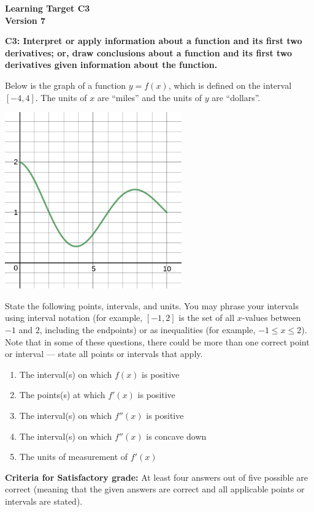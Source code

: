 \documentclass[10pt]{article}
\begin{document}
	\vspace*{0in}

		\begin{center}
			\textbf{Learning Target C3 \\
			Version 7} \\
		\end{center}


\begin{framed}
	\textbf{C3: Interpret or apply information about a function and its first two derivatives; or, draw conclusions about a function and its first two derivatives given information about the function. }
\end{framed}

Below is the graph of a function $y = f(x)$, which is defined on the interval $[-4,4]$. The units of $x$ are ``miles'' and the units of $y$ are ``dollars''. 
\begin{center}
    \includegraphics[width=3in]{ltc8-v2.png}
\end{center}
State the following points, intervals, and units. You may phrase your intervals using interval notation (for example, $[-1,2]$ is the set of all $x$-values between $-1$ and $2$, including the endpoints) or as inequalities (for example, $-1 \leq x \leq 2$). Note that in some of these questions, there could be more than one correct point or interval --- state all points or intervals that apply. 

\begin{enumerate}
    \item The interval(s) on which $f(x)$ is positive
    \item The points(s) at which $f'(x)$ is positive  
    \item The interval(s) on which $f''(x)$ is positive 
    \item The interval(s) on which $f''(x)$ is concave down
    \item The units of measurement of $f'(x)$
\end{enumerate}


\vfill


\begin{small}
    \begin{framed}
        	\textbf{Criteria for Satisfactory grade:} At least four answers out of five possible are correct (meaning that the given answers are correct and all applicable points or intervals are stated). 
    \end{framed}

\end{small}
\end{document}
